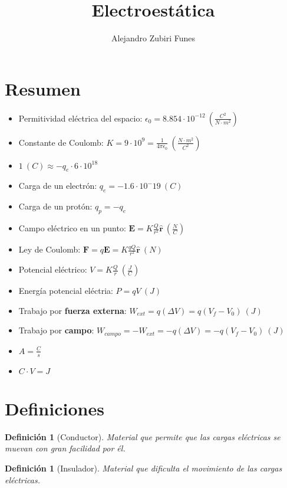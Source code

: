 \documentclass{article}
\title{Electroestática}
\author{Alejandro Zubiri Funes}
\date{}
\newtheorem*{Conductor*}{Definición}
\newtheorem*{Insulador*}{Definición}
\begin{document}
\maketitle
\section*{Resumen}
\begin{itemize}
    \item Permitividad eléctrica del espacio: $\epsilon_0= 8.854\cdot 10^{-12}\:(\frac{C^2}{N\cdot m^2})$ 
    \item Constante de Coulomb: $K=9\cdot 10^9= \frac{1}{4\pi \epsilon_0}\:( \frac{N\cdot m^2}{C^2})$
    \item $1\:(C)\approx-q_e\cdot 6\cdot 10^{18}$ 
    \item Carga de un electrón: $q_e=-1.6\cdot 10^-19\:(C)$
    \item Carga de un protón: $q_p=-q_e$
    \item Campo eléctrico en un punto: $\mathbf{E}=K \frac{Q}{r^2}\hat{\mathbf{r}}\:(\frac{N}{C})$
    \item Ley de Coulomb: $\mathbf{F}=q\mathbf{E}=K \frac{qQ}{r^2}\hat{\mathbf{r}}\:(N)$
    \item Potencial eléctrico: $V=K \frac{Q}{r}\:(\frac{J}{C})$
    \item Energía potencial eléctria: $P=qV\:(J)$
    \item Trabajo por \textbf{fuerza externa}: $W_{ext}=q(\Delta V)=q(V_f-V_0)\:(J)$
    \item Trabajo por \textbf{campo}: $W_{campo}=-W_{ext}=-q(\Delta V)=-q(V_f-V_0)\:(J)$
    \item $A= \frac{C}{s}$
    \item $C\cdot V=J$
\end{itemize}
\pagebreak

\section*{Definiciones}
\begin{Conductor*}[Conductor]
    Material que permite que las cargas eléctricas se muevan con gran facilidad por él.
\end{Conductor*}

\begin{Insulador*}[Insulador]
    Material que dificulta el movimiento de las cargas eléctricas.
\end{Insulador*}
\end{document}
